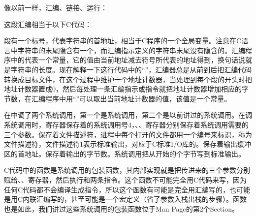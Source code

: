 


像以前一样，汇编、链接、运行：




这段汇编相当于以下C代码：




段有一个标号，代表字符串的首地址，相当于C程序的一个全局变量。注意在C语言中字符串的末尾隐含有一个，而汇编指示定义的字符串末尾没有隐含的。汇编程序中的代表一个常量，它的值由当前地址减去符号所代表的地址得到，换句话说就是字符串的长度。现在解释一下这行代码中的“.”，汇编器总是从前到后把汇编代码转换成目标文件，在这个过程中维护一个地址计数器，当处理到每个段的开头时把地址计数器置成0，然后每处理一条汇编指示或指令就把地址计数器增加相应的字节数，在汇编程序中用“.”可以取出当前地址计数器的值，该值是一个常量。



在中调了两个系统调用，第一个是系统调用，第二个是以前讲过的系统调用。在调系统调用时，寄存器保存着的系统调用号4，、、寄存器分别保存着系统调用需要的三个参数。保存着文件描述符，进程中每个打开的文件都用一个编号来标识，称为文件描述符，文件描述符1表示标准输出，对应于C标准I/\BookSplit{}O库的。保存着输出缓冲区的首地址。保存着输出的字节数。系统调用把从开始的个字节写到标准输出。



C代码中的函数是系统调用的包装函数，其内部实现就是把传进来的三个参数分别赋给、、寄存器，然后执行和两条指令。这个函数不可能完全用C代码来写，因为任何C代码都不会编译生成指令，所以这个函数有可能是完全用汇编写的，也可能是用C内联汇编写的，甚至可能是一个宏定义（省了参数入栈出栈的步骤）。函数也是如此，我们讲过这些系统调用的包装函数位于Man Page的第2个Section。

